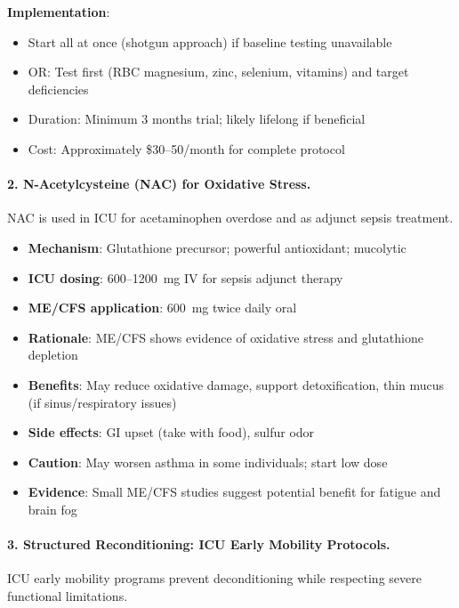 \begin{tcolorbox}[colback=blue!5!white,colframe=blue!75!black,title=ICU-Derived Micronutrient Protocol for ME/CFS]
\textbf{Implementation}:
\begin{itemize}
    \item Start all at once (shotgun approach) if baseline testing unavailable
    \item OR: Test first (RBC magnesium, zinc, selenium, vitamins) and target deficiencies
    \item Duration: Minimum 3 months trial; likely lifelong if beneficial
    \item Cost: Approximately \$30--50/month for complete protocol
\end{itemize}

\end{tcolorbox}

\paragraph{2. N-Acetylcysteine (NAC) for Oxidative Stress.}
NAC is used in ICU for acetaminophen overdose and as adjunct sepsis treatment.

\begin{itemize}
    \item \textbf{Mechanism}: Glutathione precursor; powerful antioxidant; mucolytic
    \item \textbf{ICU dosing}: 600--1200~mg IV for sepsis adjunct therapy
    \item \textbf{ME/CFS application}: 600~mg twice daily oral
    \item \textbf{Rationale}: ME/CFS shows evidence of oxidative stress and glutathione depletion
    \item \textbf{Benefits}: May reduce oxidative damage, support detoxification, thin mucus (if sinus/respiratory issues)
    \item \textbf{Side effects}: GI upset (take with food), sulfur odor
    \item \textbf{Caution}: May worsen asthma in some individuals; start low dose
    \item \textbf{Evidence}: Small ME/CFS studies suggest potential benefit for fatigue and brain fog
\end{itemize}

\paragraph{3. Structured Reconditioning: ICU Early Mobility Protocols.}
ICU early mobility programs prevent deconditioning while respecting severe functional limitations.

